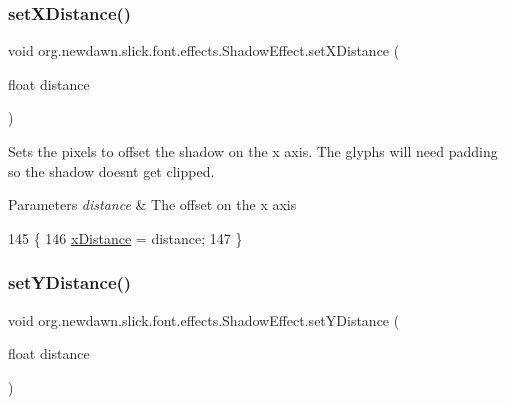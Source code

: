 \subsubsection{\texorpdfstring{set\+X\+Distance()}{setXDistance()}}
{\footnotesize\ttfamily void org.\+newdawn.\+slick.\+font.\+effects.\+Shadow\+Effect.\+set\+X\+Distance (\begin{DoxyParamCaption}\item[{float}]{distance }\end{DoxyParamCaption})\hspace{0.3cm}{\ttfamily [inline]}}

Sets the pixels to offset the shadow on the x axis. The glyphs will need padding so the shadow doesn\textquotesingle{}t get clipped.


\begin{DoxyParams}{Parameters}
{\em distance} & The offset on the x axis \\
\hline
\end{DoxyParams}

\begin{DoxyCode}
145                                              \{
146         \mbox{\hyperlink{classorg_1_1newdawn_1_1slick_1_1font_1_1effects_1_1_shadow_effect_a4d3581fba8877de112c8a1ec28cdf03d}{xDistance}} = distance;
147     \}
\end{DoxyCode}
\mbox{\label{classorg_1_1newdawn_1_1slick_1_1font_1_1effects_1_1_shadow_effect_afee799d3dee0cbb0fff7408845149552}} 
\subsubsection{\texorpdfstring{set\+Y\+Distance()}{setYDistance()}}
{\footnotesize\ttfamily void org.\+newdawn.\+slick.\+font.\+effects.\+Shadow\+Effect.\+set\+Y\+Distance (\begin{DoxyParamCaption}\item[{float}]{distance }\end{DoxyParamCaption})\hspace{0.3cm}{\ttfamily [inline]}}

